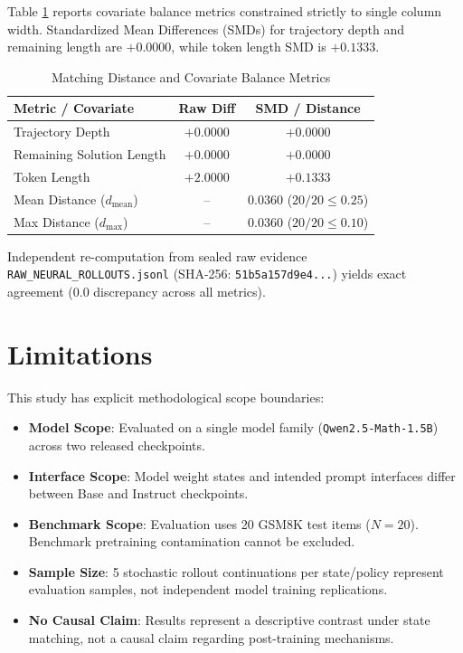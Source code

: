 \documentclass[conference]{IEEEtran}
\begin{document}
Table \ref{tab:sensitivity} reports covariate balance metrics constrained strictly to single column width. Standardized Mean Differences (SMDs) for trajectory depth and remaining length are $+0.0000$, while token length SMD is $+0.1333$.

\begin{table}[htbp]
\caption{Matching Distance and Covariate Balance Metrics}
\label{tab:sensitivity}
\centering
\begin{tabularx}{\columnwidth}{Xcc}
\toprule
\textbf{Metric / Covariate} & \textbf{Raw Diff} & \textbf{SMD / Distance} \\
\midrule
Trajectory Depth & $+0.0000$ & $+0.0000$ \\
Remaining Solution Length & $+0.0000$ & $+0.0000$ \\
Token Length & $+2.0000$ & $+0.1333$ \\
\midrule
Mean Distance ($d_{\text{mean}}$) & -- & $0.0360$ ($20/20 \le 0.25$) \\
Max Distance ($d_{\max}$) & -- & $0.0360$ ($20/20 \le 0.10$) \\
\bottomrule
\end{tabularx}
\end{table}

Independent re-computation from sealed raw evidence \texttt{RAW\_NEURAL\_ROLLOUTS.jsonl} (SHA-256: \texttt{51b5a157d9e4...}) yields exact agreement ($0.0$ discrepancy across all metrics).

\section{Limitations}
This study has explicit methodological scope boundaries:
\begin{itemize}
    \item \textbf{Model Scope}: Evaluated on a single model family (\texttt{Qwen2.5-Math-1.5B}) across two released checkpoints.
    \item \textbf{Interface Scope}: Model weight states and intended prompt interfaces differ between Base and Instruct checkpoints.
    \item \textbf{Benchmark Scope}: Evaluation uses 20 GSM8K test items ($N=20$). Benchmark pretraining contamination cannot be excluded.
    \item \textbf{Sample Size}: 5 stochastic rollout continuations per state/policy represent evaluation samples, not independent model training replications.
    \item \textbf{No Causal Claim}: Results represent a descriptive contrast under state matching, not a causal claim regarding post-training mechanisms.
\end{itemize}
\end{document}
